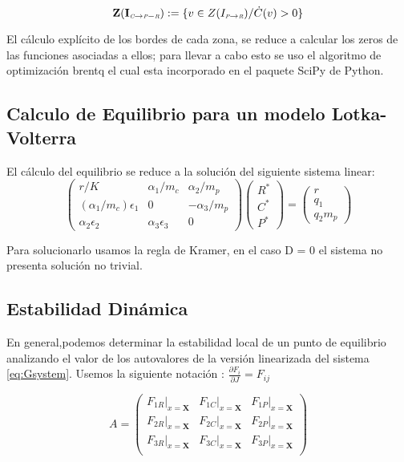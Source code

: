 \begin{equation}
\mathbf{Z(I_{\textit{\tiny C} \to \textit{\tiny P}-\textit{\tiny R}})} := \{v \in Z(I_{\textit{\tiny P} \to \textit{\tiny R}}) / \dot{C}(v) > 0\}
\end{equation}


El c\'alculo expl\'icito de los bordes de cada zona, se reduce a calcular los zeros de las funciones asociadas a ellos; para llevar a cabo esto se uso el algoritmo de optimizaci\'on brentq el cual esta incorporado en el paquete SciPy de Python.


\subsection{Calculo de Equilibrio para un modelo Lotka-Volterra}\label{subsec:equil}
El c\'alculo del equilibrio se reduce a la soluci\'on del siguiente sistema linear:
\begin{equation}
\begin{pmatrix}
r/K & \alpha_1/m_c & \alpha_2/m_p \\
(\alpha_1/m_c)\epsilon_1& 0 & -\alpha_3/m_p \\
\alpha_2 \epsilon_2 & \alpha_3 \epsilon_3 & 0
\end{pmatrix}
\begin{pmatrix}
R^* \\
C^* \\
P^* 
\end{pmatrix}
=
\begin{pmatrix}
r \\
q_1 \\
q_2 m_p
\end{pmatrix}
\end{equation}

Para solucionarlo usamos la regla de Kramer, en el caso D = 0 el sistema no presenta soluci\'on no trivial.

\subsection{Estabilidad Din\'amica}\label{subsec:stab}
En general,podemos determinar la estabilidad local de un punto de equilibrio analizando el valor de los autovalores de la versi\'on linearizada del sistema \eqref{eq:Gsystem}. \citep{yodzis1989introduction}
Usemos la siguiente notaci\'on : $ \frac{\partial F_i}{\partial J} = F_{ij} $

\begin{equation} \label{eq:linver}
A = \begin{pmatrix}
\left. F_{1R} \right|_{x=\mathbf{X}}& \left.F_{1C}\right|_{x=\mathbf{X}}&\left.F_{1P}\right|_{x=\mathbf{X}}\\
\left. F_{2R}\right|_{x=\mathbf{X}}& \left.F_{2C}\right|_{x=\mathbf{X}}&\left.F_{2P}\right|_{x=\mathbf{X}}\\
\left. F_{3R}\right|_{x=\mathbf{X}}& \left.F_{3C}\right|_{x=\mathbf{X}}&\left.F_{3P}\right|_{x=\mathbf{X}}\\
\end{pmatrix}
\end{equation}


